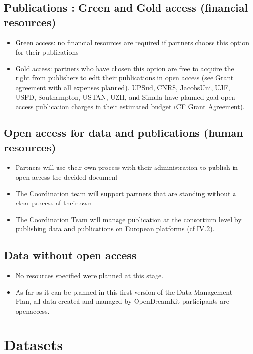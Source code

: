 \documentclass[12pt]{article}
\begin{document}
\subsection{Publications : Green and Gold access (financial resources)}

\begin{itemize}
\item{}Green access: no financial resources are required if partners choose this option for their publications
\item{}Gold access: partners who have chosen this option are free to acquire the right from publishers to edit their publications in open access (see Grant agreement with all expenses planned).
UPSud, CNRS, JacobsUni, UJF, USFD, Southampton, USTAN, UZH, and Simula have planned gold open access publication charges in their estimated budget (CF Grant Agreement).
\end{itemize}

\subsection{Open access for data and publications (human resources)}

\begin{itemize}
\item{}Partners will use their own process with their administration to publish in open access the decided document
\item{}The Coordination team will support partners that are standing without a clear process of their own
\item{}The Coordination Team will manage publication at the consortium level by publishing data and publications on European platforms (cf IV.2).
\end{itemize}

\subsection{Data without open access}
\begin{itemize}
\item{}No resources specified were planned at this stage.
\item{}As far as it can be planned in this first version of the Data Management Plan, all data created and managed by OpenDreamKit participants are openaccess.
\end{itemize}

\section{Datasets}
\end{document}
